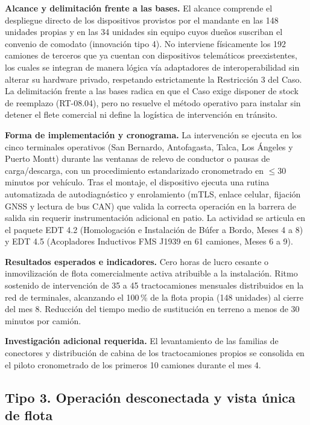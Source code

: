 \textbf{Alcance y delimitación frente a las bases.} El alcance comprende el despliegue directo de los dispositivos provistos por el mandante en las 148 unidades propias y en las 34 unidades sin equipo cuyos dueños suscriban el convenio de comodato (innovación tipo 4). No interviene físicamente los 192 camiones de terceros que ya cuentan con dispositivos telemáticos preexistentes, los cuales se integran de manera lógica vía adaptadores de interoperabilidad sin alterar su hardware privado, respetando estrictamente la Restricción 3 del Caso. La delimitación frente a las bases radica en que el Caso exige disponer de stock de reemplazo (RT-08.04), pero no resuelve el método operativo para instalar sin detener el flete comercial ni define la logística de intervención en tránsito.

\textbf{Forma de implementación y cronograma.} La intervención se ejecuta en los cinco terminales operativos (San Bernardo, Antofagasta, Talca, Los Ángeles y Puerto Montt) durante las ventanas de relevo de conductor o pausas de carga/descarga, con un procedimiento estandarizado cronometrado en $\le 30$ minutos por vehículo. Tras el montaje, el dispositivo ejecuta una rutina automatizada de autodiagnóstico y enrolamiento (mTLS, enlace celular, fijación GNSS y lectura de bus CAN) que valida la correcta operación en la barrera de salida sin requerir instrumentación adicional en patio. La actividad se articula en el paquete EDT 4.2 (Homologación e Instalación de Búfer a Bordo, Meses 4 a 8) y EDT 4.5 (Acopladores Inductivos FMS J1939 en 61 camiones, Meses 6 a 9).

\textbf{Resultados esperados e indicadores.} Cero horas de lucro cesante o inmovilización de flota comercialmente activa atribuible a la instalación. Ritmo sostenido de intervención de 35 a 45 tractocamiones mensuales distribuidos en la red de terminales, alcanzando el 100\,\% de la flota propia (148 unidades) al cierre del mes 8. Reducción del tiempo medio de sustitución en terreno a menos de 30 minutos por camión.

\textbf{Investigación adicional requerida.} El levantamiento de las familias de conectores y distribución de cabina de los tractocamiones propios se consolida en el piloto cronometrado de los primeros 10 camiones durante el mes 4.

\subsection{Tipo 3. Operación desconectada y vista única de flota}

